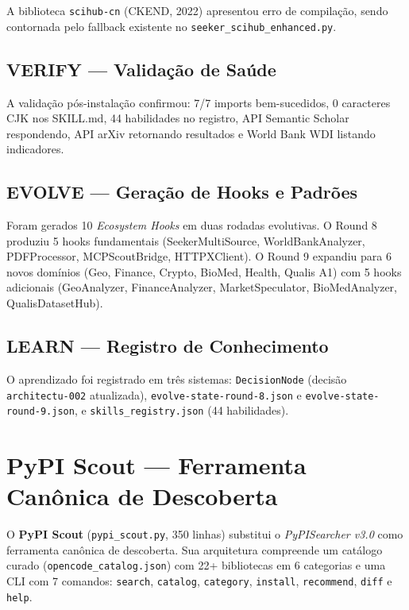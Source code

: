 \documentclass[12pt,a4paper]{article}
\begin{document}
A biblioteca \texttt{scihub-cn} (CKEND, 2022) apresentou erro de compilação, sendo contornada pelo fallback existente no \texttt{seeker\_scihub\_enhanced.py}.

\subsection{VERIFY --- Validação de Saúde}

A validação pós-instalação confirmou: 7/7 imports bem-sucedidos, 0 caracteres CJK nos SKILL.md, 44 habilidades no registro, API Semantic Scholar respondendo, API arXiv retornando resultados e World Bank WDI listando indicadores.

\subsection{EVOLVE --- Geração de Hooks e Padrões}

Foram gerados 10 \textit{Ecosystem Hooks} em duas rodadas evolutivas. O Round 8 produziu 5 hooks fundamentais (SeekerMultiSource, WorldBankAnalyzer, PDFProcessor, MCPScoutBridge, HTTPXClient). O Round 9 expandiu para 6 novos domínios (Geo, Finance, Crypto, BioMed, Health, Qualis A1) com 5 hooks adicionais (GeoAnalyzer, FinanceAnalyzer, MarketSpeculator, BioMedAnalyzer, QualisDatasetHub).

\subsection{LEARN --- Registro de Conhecimento}

O aprendizado foi registrado em três sistemas: \texttt{DecisionNode} (decisão \texttt{architectu-002} atualizada), \texttt{evolve-state-round-8.json} e \texttt{evolve-state-round-9.json}, e \texttt{skills\_registry.json} (44 habilidades).

\section{PyPI Scout --- Ferramenta Canônica de Descoberta}

O \textbf{PyPI Scout} (\texttt{pypi\_scout.py}, 350 linhas) substitui o \textit{PyPISearcher v3.0} como ferramenta canônica de descoberta. Sua arquitetura compreende um catálogo curado (\texttt{opencode\_catalog.json}) com 22+ bibliotecas em 6 categorias e uma CLI com 7 comandos: \texttt{search}, \texttt{catalog}, \texttt{category}, \texttt{install}, \texttt{recommend}, \texttt{diff} e \texttt{help}.
\end{document}
